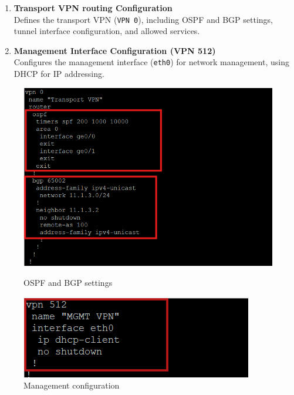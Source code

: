 \documentclass[12pt,english]{report}
\begin{document}
\begin{enumerate}
\item \textbf{Transport VPN routing Configuration} \\
Defines the transport VPN (\texttt{VPN 0}), including OSPF and BGP settings, tunnel interface configuration, and allowed services.

\item \textbf{Management Interface Configuration (VPN 512)} \\
Configures the management interface (\texttt{eth0}) for network management, using DHCP for IP addressing.
\end{enumerate}
\begin{figure}[H]
    \begin{minipage}[b]{0.48\textwidth} %
        \centering
        \includegraphics[width=\textwidth]{chapitre 3/2vedgea2.png}
        \caption{OSPF and BGP settings}
        \label{fig:OSPF and BGP settings}
    \end{minipage}
    \hfill %
    \begin{minipage}[b]{0.48\textwidth} %
        \centering
        \includegraphics[width=\textwidth]{chapitre 3/dcvedge512.png}
        \caption{Management configuration}
        \label{fig:Management configuration}
    \end{minipage}
\end{figure}
\end{document}
